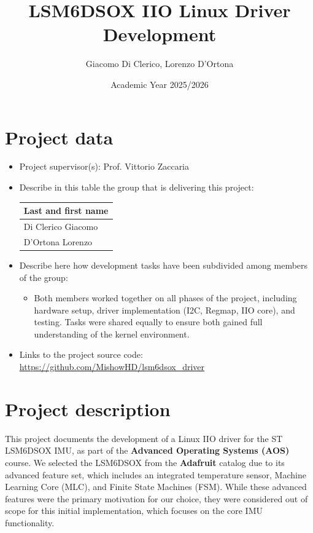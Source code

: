 \documentclass[10pt,a4paper]{article}
\author{Giacomo Di Clerico, Lorenzo D'Ortona}
\date{Academic Year 2025/2026}
\title{LSM6DSOX IIO Linux Driver Development}
\begin{document}
\maketitle
\tableofcontents

\section{Project data}

\begin{itemize}
\item 
  Project supervisor(s): Prof. Vittorio Zaccaria

\item 
Describe in this table the group that is delivering this project:

\begin{center}
\begin{tabular}{l}
Last and first name \\
\hline
  Di Clerico Giacomo \\
  D'Ortona Lorenzo \\
\end{tabular}
\end{center}

\item
Describe here how development tasks have been subdivided among members
of the group:

\begin{itemize}
\item Both members worked together on all phases of the project, including hardware setup, driver implementation (I2C, Regmap, IIO core), and testing. Tasks were shared equally to ensure both gained full understanding of the kernel environment.
\end{itemize}

\item Links to the project source code: \url{https://github.com/MishowHD/lsm6dsox_driver}

\end{itemize}


\section{Project description}

This project documents the development
 of a Linux IIO driver for the ST LSM6DSOX IMU, as part of the \textbf{Advanced Operating Systems (AOS)} course. We selected the LSM6DSOX from the \textbf{Adafruit} catalog due to its advanced feature set, which includes an integrated temperature sensor, Machine Learning Core (MLC), and Finite State Machines (FSM). While these advanced features were the primary motivation for our choice, they were considered out of scope for this initial implementation, which focuses on the core IMU functionality.
\end{document}
